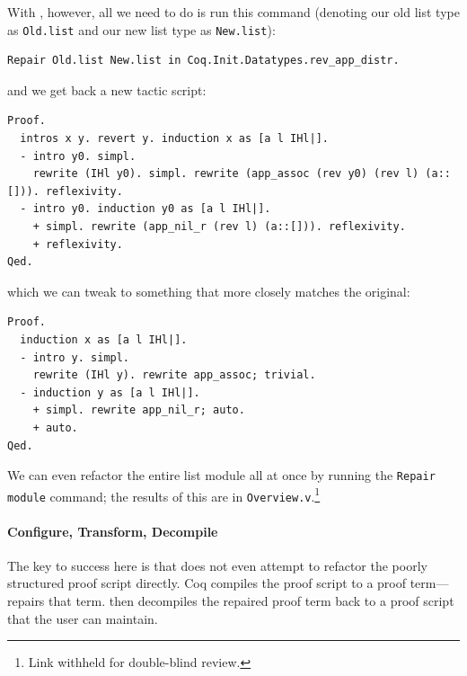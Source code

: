 With \toolname, however, all we need to do is run this command (denoting our old list type as \lstinline{Old.list} and our new list type as \lstinline{New.list}): %

\begin{lstlisting}
Repair Old.list New.list in Coq.Init.Datatypes.rev_app_distr.
\end{lstlisting}
and we get back a new tactic script:

\begin{lstlisting}
Proof.
  intros x y. revert y. induction x as [a l IHl|].
  - intro y0. simpl.
    rewrite (IHl y0). simpl. rewrite (app_assoc (rev y0) (rev l) (a::[])). reflexivity.
  - intro y0. induction y0 as [a l IHl|].
    + simpl. rewrite (app_nil_r (rev l) (a::[])). reflexivity.
    + reflexivity.
Qed.
\end{lstlisting}
which we can tweak to something that more closely matches the original:

\begin{lstlisting}
Proof.
  induction x as [a l IHl|].
  - intro y. simpl.
    rewrite (IHl y). rewrite app_assoc; trivial.
  - induction y as [a l IHl|].
    + simpl. rewrite app_nil_r; auto.
    + auto.
Qed.
\end{lstlisting}
We can even refactor the entire list module all at once by running the \lstinline{Repair module}
command; the results of this are in \lstinline{Overview.v}.\footnote{Link withheld for double-blind review.} %

\paragraph{Configure, Transform, Decompile}
The key to success here is that \toolname does not even attempt to refactor the poorly structured proof script directly.
Coq compiles the proof script to a proof term---\toolname repairs that term.
\toolname then decompiles the repaired proof term back to a proof script that the user can maintain.

